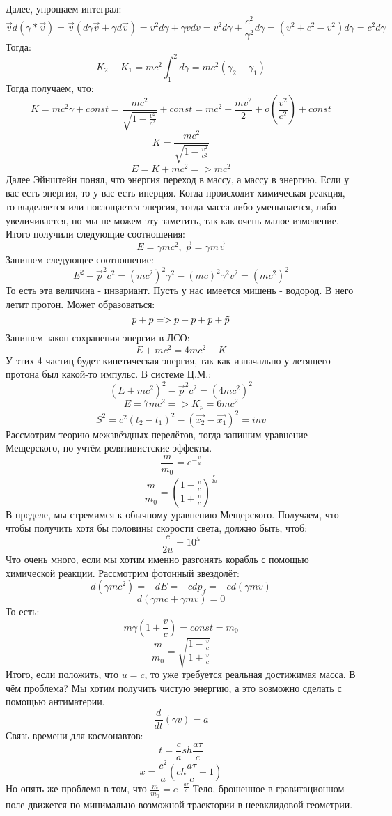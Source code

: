 Далее, упрощаем интеграл:
\[\Vec{v}d(\gamma * \Vec{v}) = \Vec{v}(d\gamma \Vec{v} + \gamma d\Vec{v}) = v^2d\gamma + \gamma v dv = v^2d\gamma + \frac{c^2}{\gamma^2} d\gamma = (v^2 + c^2 - v^2)d\gamma = c^2d\gamma\]
Тогда:
\[K_2 - K_1 = mc^2 \int_1^2 d\gamma = mc^2(\gamma_2 - \gamma_1)\]
Тогда получаем, что:
\[K = mc^2\gamma + const = \frac{mc^2}{\sqrt{1 - \frac{v^2}{c^2}}} + const = mc^2 + \frac{mv^2}{2} + o(\frac{v^2}{c^2}) + const\]
\[K = \frac{mc^2}{\sqrt{1 - \frac{v^2}{c^2}}}\]
\[E = K + mc^2 => mc^2\]
Далее Эйнштейн понял, что энергия переход в массу, а массу в энергию. Если у вас есть энергия, то у вас есть инерция.
Когда происходит химическая реакция, то выделяется или поглощается энергия, тогда масса либо уменьшается, либо увеличивается, но мы не можем эту заметить, так как очень малое изменение.
Итого получили следующие соотношения:
\[E = \gamma mc^2, \ \Vec{p} = \gamma m\Vec{v}\]
Запишем следующее соотношение:
\[E^2 - \Vec{p}^2c^2 = (mc^2)^2\gamma^2 - (mc)^2\gamma^2v^2 = (mc^2)^2\]
То есть эта величина - инвариант.
Пусть у нас имеется мишень - водород. В него летит протон.
Может образоваться:
\[p + p => p + p + p + \Tilde{p}\]
Запишем закон сохранения энергии в ЛСО:
\[E + mc^2 = 4mc^2 + K\]
У этих 4 частиц будет кинетическая энергия, так как изначально у летящего протона был какой-то импульс.
В системе Ц.М.:
\[(E + mc^2)^2 - \Vec{p}^2c^2 = (4mc^2)^2\]
\[E = 7mc^2 => K_p = 6mc^2\]
\[S^2 = c^2(t_2 - t_1)^2 - (\Vec{x_2} - \Vec{x_1})^2 = inv\]
Рассмотрим теорию межзвёздных перелётов, тогда запишим уравнение Мещерского, но учтём релятивистские эффекты.
\[\frac{m}{m_0} = e^{-\frac{v}{u}}\]
\[\frac{m}{m_0} = (\frac{1 - \frac{v}{c}}{1 + \frac{v}{c}})^{\frac{c}{2u}}\]
В пределе, мы стремимся к обычному уравнению Мещерского.
Получаем, что чтобы получить хотя бы половины скорости света, должно быть, чтоб:
\[\frac{c}{2u} = 10^5\]
Что очень много, если мы хотим именно разгонять корабль с помощью химической реакции.
Рассмотрим фотонный звездолёт:
\[d(\gamma mc^2) = - dE = - cdp_{f} = - cd(\gamma mv)\]
\[d(\gamma mc + \gamma mv) = 0\]
То есть:
\[m\gamma(1 + \frac{v}{c}) = const = m_0\]
\[\frac{m}{m_0} = \sqrt{\frac{1 - \frac{v}{c}}{1 + \frac{v}{c}}}\]
Итого, если положить, что $u = c$, то уже требуется реальная достижимая масса.
В чём проблема? Мы хотим получить чистую энергию, а это возможно сделать с помощью антиматерии. 
\[\frac{d}{dt}(\gamma v) = a\]
Связь времени для космонавтов:
\[t = \frac{c}{a}sh\frac{a\tau}{c}\]
\[x = \frac{c^2}{a}(ch \frac{a\tau}{c} - 1)\]
Но опять же проблема в том, что $\frac{m}{m_0} = e^{-\frac{a\tau}{c}}$
Тело, брошенное в гравитационном поле движется по минимально возможной траектории в неевклидовой геометрии.